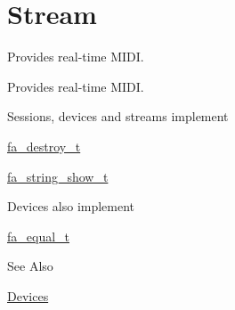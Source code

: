 \hypertarget{group___fa_midi_stream}{\section{Stream}
\label{group___fa_midi_stream}
}


Provides real-\/time M\-I\-D\-I.  


Provides real-\/time M\-I\-D\-I. \begin{DoxyParagraph}{Sessions, devices and streams implement }

\begin{DoxyItemize}
\item \hyperlink{structfa__destroy__t}{fa\-\_\-destroy\-\_\-t}
\item \hyperlink{structfa__string__show__t}{fa\-\_\-string\-\_\-show\-\_\-t}
\end{DoxyItemize}
\end{DoxyParagraph}
\begin{DoxyParagraph}{Devices also implement }

\begin{DoxyItemize}
\item \hyperlink{structfa__equal__t}{fa\-\_\-equal\-\_\-t}
\end{DoxyItemize}
\end{DoxyParagraph}
\begin{DoxySeeAlso}{See Also}

\begin{DoxyItemize}
\item \hyperlink{md__devices_Devices}{Devices} 
\end{DoxyItemize}
\end{DoxySeeAlso}
